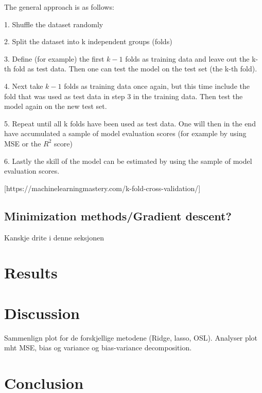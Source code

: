 \documentclass[a4paper,12pt]{article}
\begin{document}
The general approach is as follows:\newline

1. Shuffle the dataset randomly\newline

2. Split the dataset into k independent groups (folds)\newline

3. Define (for example) the first $k-1$ folds as training data and leave out the k-th fold as test data. Then one can test the model on the test set (the k-th fold).\newline

4. Next take $k-1$ folds as training data once again, but this time include the fold that was used as test data in step 3 in the training data. Then test the model again on the new test set.\newline

5. Repeat until all k folds have been used as test data. One will then in the end have accumulated a sample of model evaluation scores (for example by using MSE or the $R^2$ score) \newline

6. Lastly the skill of the model can be estimated by using the sample of model evaluation scores.\newline

[https://machinelearningmastery.com/k-fold-cross-validation/]

\subsection{Minimization methods/Gradient descent?}
Kanskje drite i denne seksjonen

\section{Results}

\section{Discussion}
Sammenlign plot for de forskjellige metodene (Ridge, lasso, OSL). Analyser plot mht MSE, bias og variance og bias-variance decomposition.

\section{Conclusion}
\end{document}
